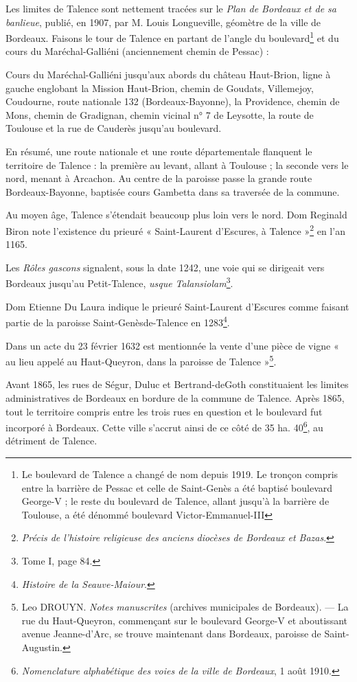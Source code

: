 Les limites de Talence sont nettement tracées sur le \textit{Plan de Bordeaux et de sa banlieue}, publié, en 1907, par M. Louis Longueville, géomètre de la ville de Bordeaux. Faisons le tour de Talence en partant de l'angle du boulevard\footnote{Le boulevard de Talence a changé de nom depuis 1919. Le tronçon compris entre la barrière de Pessac et celle de Saint-Genès a été baptisé boulevard George-V ; le reste du boulevard de Talence, allant jusqu'à la barrière de Toulouse, a été dénommé boulevard Victor-Emmanuel-III} et du cours du Maréchal-Galliéni (anciennement chemin de Pessac) : 

Cours du Maréchal-Galliéni jusqu'aux abords du château Haut-Brion, ligne à gauche englobant la Mission Haut-Brion, chemin de Goudats, Villemejoy, Coudourne, route nationale 132 (Bordeaux-Bayonne), la Providence, chemin de Mons, chemin de Gradignan, chemin vicinal n° 7 de Leysotte, la route de Toulouse et la rue de Cauderès jusqu'au boulevard. 

En résumé, une route nationale et une route départementale flanquent le territoire de Talence : la première au levant, allant à Toulouse ; la seconde vers le nord, menant à Arcachon. Au centre de la paroisse passe la grande route Bordeaux-Bayonne, baptisée cours Gambetta dans sa traversée de la commune. 

Au moyen âge, Talence s'étendait beaucoup plus loin vers le nord. Dom Reginald Biron note l'existence du prieuré « Saint-Laurent d'Escures, à Talence »\footnote{\textit{Précis de l'histoire religieuse des anciens diocèses de Bordeaux et Bazas}.} en l'an 1165. 

Les \textit{Rôles gascons} signalent, sous la date 1242, une voie qui se dirigeait vers Bordeaux jusqu'au Petit-Talence, \textit{usque Talansiolam}\footnote{Tome I, page 84.}.

Dom Etienne Du Laura indique le prieuré Saint-Laurent d'Escures comme faisant partie de la paroisse Saint-Genèsde-Talence en 1283\footnote{\textit{Histoire de la Seauve-Maiour}.}.

Dans un acte du 23 février 1632 est mentionnée la vente d'une pièce de vigne « au lieu appelé au Haut-Queyron, dans la paroisse de Talence »\footnote{Leo DROUYN. \textit{Notes manuscrites} (archives municipales de Bordeaux). — La rue du Haut-Queyron, commençant sur le boulevard George-V et aboutissant avenue Jeanne-d'Arc, se trouve maintenant dans Bordeaux, paroisse de Saint-Augustin.}. 

Avant 1865, les rues de Ségur, Duluc et Bertrand-deGoth constituaient les limites administratives de Bordeaux en bordure de la commune de Talence. Après 1865, tout le territoire compris entre les trois rues en question et le boulevard fut incorporé à Bordeaux. Cette ville s'accrut ainsi de ce côté de 35 ha. 40\footnote{\textit{Nomenclature alphabétique des voies de la ville de Bordeaux}, 1\ier{} août 1910.}, au détriment de Talence. 

